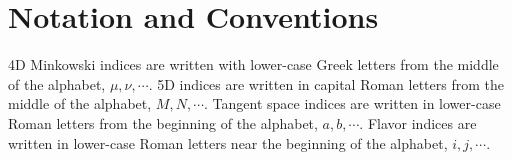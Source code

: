 \documentclass[12pt]{article}
\numberwithin{equation}{section}    %
\begin{document}


\appendix

\section{Notation and Conventions}
\label{app:conventions}


4D Minkowski indices are written with lower-case Greek letters from the middle of the alphabet, $\mu, \nu, \cdots$. 5D indices are written in capital Roman letters from the middle of the alphabet, $M, N, \cdots$. Tangent space indices are written in lower-case Roman letters from the beginning of the alphabet, $a,b, \cdots$. Flavor indices are written in lower-case Roman letters near the beginning of the alphabet, $i,j,\cdots$.
\end{document}
